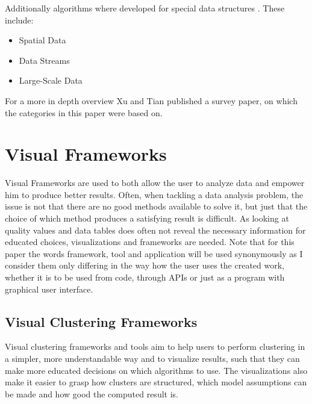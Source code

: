 \documentclass[
	a4paper,
	english,
	twoside,
	openright,               
	11pt                            
	]{report}
\begin{document}
Additionally algorithms where developed for special data structures \cite{surveyclustering}. These include:

\begin{itemize}
  \item Spatial Data
  \item Data Streams
  \item Large-Scale Data
\end{itemize}

For a more in depth overview Xu and Tian \cite{surveyclustering} published a survey paper, on which the categories in this paper were based on.

\section{Visual Frameworks}
Visual Frameworks are used to both allow the user to analyze data and empower him to produce better results. Often, when tackling a data analysis problem, the issue is not that there are no good methods available to solve it, but just that the choice of which method produces a satisfying result is difficult. As looking at quality values and data tables does often not reveal the necessary information for educated choices, visualizations and frameworks are needed. Note that for this paper the words framework, tool and application will be used synonymously as I consider them only differing in the way how the user uses the created work, whether it is to be used from code, through APIs or just as a program with graphical user interface.

\subsection{Visual Clustering Frameworks}
Visual clustering frameworks and tools aim to help users to perform clustering in a simpler, more understandable way and to visualize results, such that they can make more educated decisions on which algorithms to use. The visualizations also make it easier to grasp how clusters are structured, which model assumptions can be made and how good the computed result is.
\end{document}
